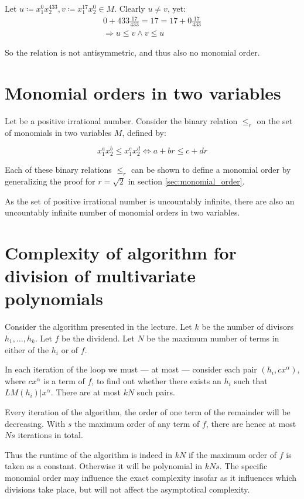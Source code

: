 \documentclass[a4paper]{scrreprt}
\begin{document}
Let $u \coloneqq x_1^0 x_2^{433}, v \coloneqq x_1^{17} x_2^0 \in M$. Clearly $u \neq v$, yet:
\begin{align*}
		0 + 433 \frac{17}{433} = 17 = 17 + 0 \frac{17}{433} \\
		\Rightarrow u \leq v \land v \leq u
\end{align*}

So the relation is not antisymmetric, and thus also no monomial order.


\section{Monomial orders in two variables}

Let be a positive irrational number. Consider the binary relation $\leq_r$ on
the set of monomials in two variables $M$, defined by:

\[
		x_1^a x_2^b \leq x_1^c x_2^d \Leftrightarrow a + br \leq c + dr
\]

Each of these binary relations $\leq_r$ can be shown to define a monomial order
by generalizing the proof for $r = \sqrt{2}$ in section \ref{sec:monomial_order}.

As the set of positive irrational number is uncountably infinite, there are
also an uncountably infinite number of monomial orders in two variables.

\section{Complexity of algorithm for division of multivariate polynomials}

Consider the algorithm presented in the lecture. Let $k$ be the number of
divisors $h_1, \ldots, h_k$. Let $f$ be the dividend. Let $N$ be the maximum
number of terms in either of the $h_i$ or of $f$.

In each iteration of the loop we must --- at most --- consider each pair $(h_i,
c x^\alpha)$, where $c x^\alpha$ is a term of $f$, to find out whether there
exists an $h_i$ such that $LM(h_i) | x^\alpha$. There are at most $kN$ such pairs.

Every iteration of the algorithm, the order of one term of the remainder will
be decreasing. With $s$ the maximum order of any term of $f$, there are hence
at most $Ns$ iterations in total.

Thus the runtime of the algorithm is indeed in $kN$ if the maximum order of $f$
is taken as a constant. Otherwise it will be polynomial in $kNs$. The specific
monomial order may influence the exact complexity insofar as it influences
which divisions take place, but will not affect the asymptotical complexity.

\printbibliography{}
\end{document}
